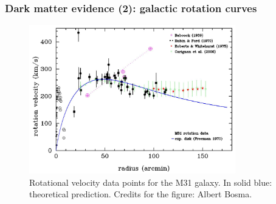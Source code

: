 \documentclass{beamer}
\begin{document}
\begin{frame}
\frametitle{Dark matter evidence (2): galactic rotation curves}
\begin{figure}[htbp]
	\centering
	\includegraphics[width=0.8\textwidth]{rotation_curves.jpg}
	\caption{Rotational velocity data points for the M31 galaxy. In solid blue: theoretical prediction. Credits for the figure: Albert Bosma.}
	\label{fig:rotation_curves}
\end{figure}
\end{frame}
\end{document}
